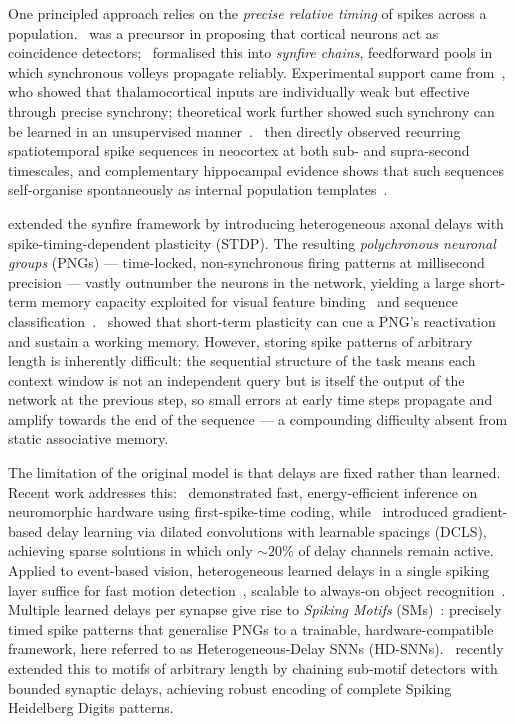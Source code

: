 \documentclass{article}
\begin{document}
One principled approach relies on the \emph{precise relative timing} of spikes across a population.~\citet{Abeles1982} was a precursor in proposing that cortical neurons act as coincidence detectors;~\citet{Bienenstock1995} formalised this into \emph{synfire chains}, feedforward pools in which synchronous volleys propagate reliably. Experimental support came from~\citet{Bruno2006}, who showed that thalamocortical inputs are individually weak but effective through precise synchrony; theoretical work further showed such synchrony can be learned in an unsupervised manner~\citep{Perrinet2002}.~\citet{Ikegaya2004} then directly observed recurring spatiotemporal spike sequences in neocortex at both sub- and supra-second timescales, and complementary hippocampal evidence shows that such sequences self-organise spontaneously as internal population templates~\citep{Villette2015}.

\citet{Izhikevich2006} extended the synfire framework by introducing heterogeneous axonal delays with spike-timing-dependent plasticity (STDP). The resulting \emph{polychronous neuronal groups} (PNGs) --- time-locked, non-synchronous firing patterns at millisecond precision --- vastly outnumber the neurons in the network, yielding a large short-term memory capacity exploited for visual feature binding~\citep{Eguchi2018} and sequence classification~\cite{Paugam-Moisy2008}.~\citet{Szatmary2010} showed that short-term plasticity can cue a PNG's reactivation and sustain a working memory. However, storing spike patterns of arbitrary length is inherently difficult: the sequential structure of the task means each context window is not an independent query but is itself the output of the network at the previous step, so small errors at early time steps propagate and amplify towards the end of the sequence --- a compounding difficulty absent from static associative memory.

The limitation of the original model is that delays are fixed rather than learned. Recent work addresses this:~\citet{Goltz2021} demonstrated fast, energy-efficient inference on neuromorphic hardware using first-spike-time coding, while~\citet{Hammouamri2023} introduced gradient-based delay learning via dilated convolutions with learnable spacings (DCLS), achieving sparse solutions in which only $\sim\!20\%$ of delay channels remain active. Applied to event-based vision, heterogeneous learned delays in a single spiking layer suffice for fast motion detection~\citep{Grimaldi2023a}, scalable to always-on object recognition~\citep{Grimaldi2024}. Multiple learned delays per synapse give rise to \emph{Spiking Motifs} (SMs)~\citep{Perrinet2023}: precisely timed spike patterns that generalise PNGs to a trainable, hardware-compatible framework, here referred to as Heterogeneous-Delay SNNs (HD-SNNs).~\citet{Kronland-Martinet2025} recently extended this to motifs of arbitrary length by chaining sub-motif detectors with bounded synaptic delays, achieving robust encoding of complete Spiking Heidelberg Digits patterns.
\end{document}
